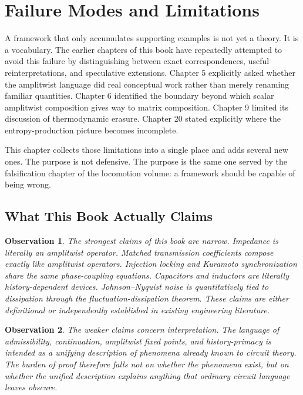 \documentclass[12pt]{article}
\newtheorem{observation}{Observation}
\begin{document}
\section{Failure Modes and Limitations}

A framework that only accumulates supporting examples is not yet a theory. It is a vocabulary. The earlier chapters of this book have repeatedly attempted to avoid this failure by distinguishing between exact correspondences, useful reinterpretations, and speculative extensions. Chapter 5 explicitly asked whether the amplitwist language did real conceptual work rather than merely renaming familiar quantities. Chapter 6 identified the boundary beyond which scalar amplitwist composition gives way to matrix composition. Chapter 9 limited its discussion of thermodynamic erasure. Chapter 20 stated explicitly where the entropy-production picture becomes incomplete.

This chapter collects those limitations into a single place and adds several new ones. The purpose is not defensive. The purpose is the same one served by the falsification chapter of the locomotion volume: a framework should be capable of being wrong.

\subsection{What This Book Actually Claims}

\begin{observation}
The strongest claims of this book are narrow. Impedance is literally an amplitwist operator. Matched transmission coefficients compose exactly like amplitwist operators. Injection locking and Kuramoto synchronization share the same phase-coupling equations. Capacitors and inductors are literally history-dependent devices. Johnson--Nyquist noise is quantitatively tied to dissipation through the fluctuation-dissipation theorem. These claims are either definitional or independently established in existing engineering literature.
\end{observation}

\begin{observation}
The weaker claims concern interpretation. The language of admissibility, continuation, amplitwist fixed points, and history-primacy is intended as a unifying description of phenomena already known to circuit theory. The burden of proof therefore falls not on whether the phenomena exist, but on whether the unified description explains anything that ordinary circuit language leaves obscure.
\end{observation}
\end{document}
